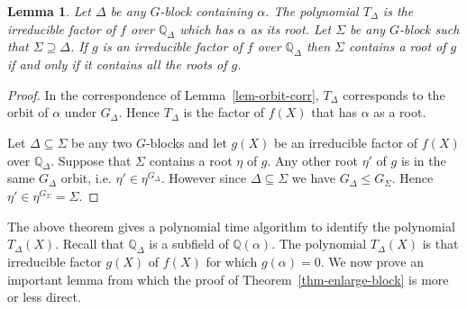 \documentclass[11pt]{madras}%
\newtheorem{lemma}[theorem]{Lemma}
\theoremstyle{remark}
\begin{document}
\begin{lemma} \label{lem-factor-blocks}%
  Let $\Delta$ be any $G$-block containing $\alpha$. The polynomial
  $T_\Delta$ is the irreducible factor of $f$ over $\mathbb{Q}_\Delta$
  which has $\alpha$ as its root.  Let $\Sigma$ be any $G$-block such
  that $\Sigma \supseteq \Delta$.  If $g$ is an irreducible factor of
  $f$ over $\mathbb{Q}_\Delta$ then $\Sigma$ contains a root of $g$ if
  and only if it contains all the roots of $g$.
\end{lemma}
\begin{proof}
  In the correspondence of Lemma~\ref{lem-orbit-corr}, $T_\Delta$
  corresponds to the orbit of $\alpha$ under $G_\Delta$. Hence
  $T_\Delta$ is the factor of $f(X)$ that has $\alpha$ as a root.

  Let $\Delta \subseteq \Sigma$ be any two $G$-blocks and let $g(X)$
  be an irreducible factor of $f(X)$ over $\mathbb{Q}_\Delta$. Suppose
  that $\Sigma$ contains a root $\eta$ of $g$.  Any other root $\eta'$
  of $g$ is in the same $G_\Delta$ orbit, i.e. $\eta' \in
  \eta^{G_\Delta}$. However since $\Delta \subseteq \Sigma$ we have
  $G_\Delta \leq G_\Sigma$. Hence $\eta' \in \eta^{G_\Sigma} =
  \Sigma$.
\end{proof}

The above theorem gives a polynomial time algorithm to identify the
polynomial $T_\Delta(X)$.  Recall that $\mathbb{Q}_\Delta$ is a
subfield of $\mathbb{Q}(\alpha)$. The polynomial $T_\Delta(X)$ is that
irreducible factor $g(X)$ of $f(X)$ for which $g(\alpha) = 0$. We now
prove an important lemma from which the proof of
Theorem~\ref{thm-enlarge-block} is more or less direct.
\end{document}
